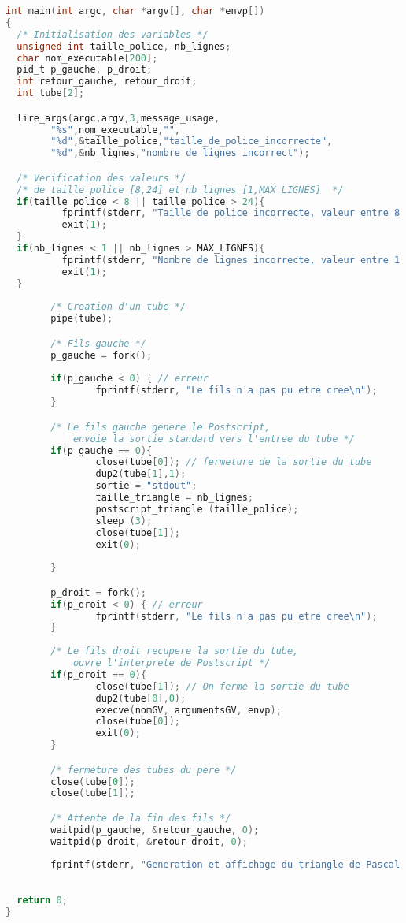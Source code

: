 \begin{lstlisting}[language=C, label={lst:tubeq5}, caption={Utilisation d'un tube dans la fonction main.}]
int main(int argc, char *argv[], char *envp[])
{
  /* Initialisation des variables */
  unsigned int taille_police, nb_lignes;
  char nom_executable[200];
  pid_t p_gauche, p_droit;
  int retour_gauche, retour_droit;
  int tube[2];

  lire_args(argc,argv,3,message_usage, 
        "%s",nom_executable,"",
        "%d",&taille_police,"taille_de_police_incorrecte",
        "%d",&nb_lignes,"nombre de lignes incorrect");

  /* Verification des valeurs */
  /* de taille_police [8,24] et nb_lignes [1,MAX_LIGNES]  */
  if(taille_police < 8 || taille_police > 24){
          fprintf(stderr, "Taille de police incorrecte, valeur entre 8 et 24 attendue\n");
          exit(1);
  }
  if(nb_lignes < 1 || nb_lignes > MAX_LIGNES){
          fprintf(stderr, "Nombre de lignes incorrecte, valeur entre 1 et %d attendue\n", MAX_LIGNES);
          exit(1);
  }
    
        /* Creation d'un tube */
        pipe(tube);

        /* Fils gauche */
        p_gauche = fork();
        
        if(p_gauche < 0) { // erreur
                fprintf(stderr, "Le fils n'a pas pu etre cree\n");
        }

		/* Le fils gauche genere le Postscript,
			envoie la sortie standard vers l'entree du tube */
        if(p_gauche == 0){
                close(tube[0]); // fermeture de la sortie du tube
                dup2(tube[1],1);
                sortie = "stdout";
                taille_triangle = nb_lignes;
                postscript_triangle (taille_police);
                sleep (3);
                close(tube[1]);
                exit(0);
                
        }

		p_droit = fork();
        if(p_droit < 0) { // erreur
                fprintf(stderr, "Le fils n'a pas pu etre cree\n");
        }
		
		/* Le fils droit recupere la sortie du tube,
			ouvre l'interprete de Postscript */
        if(p_droit == 0){
                close(tube[1]); // On ferme la sortie du tube
                dup2(tube[0],0);
                execve(nomGV, argumentsGV, envp);
                close(tube[0]);
                exit(0);
        }

        /* fermeture des tubes du pere */    
        close(tube[0]);
        close(tube[1]);

        /* Attente de la fin des fils */
        waitpid(p_gauche, &retour_gauche, 0);
        waitpid(p_droit, &retour_droit, 0);
        
        fprintf(stderr, "Generation et affichage du triangle de Pascal termine\n");
        
        
  return 0;
}
\end{lstlisting}
